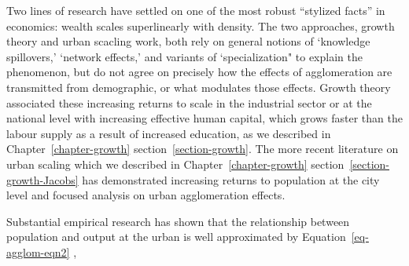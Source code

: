 Two lines of research have settled on one of the most robust ``stylized facts'' in economics: wealth scales superlinearly with density. The two approaches, growth theory and urban scacling work, both rely on general notions of `knowledge spillovers,' `network effects,' and variants of `specialization" to explain the phenomenon, but do not agree on precisely how the effects of agglomeration are transmitted from demographic, or what modulates those effects. 
 Growth theory associated these increasing returns to scale in the industrial sector or at the national level with increasing effective human capital, which grows faster than the labour supply as a result of increased education, as we described in Chapter~\ref{chapter-growth} section~\ref{section-growth}. %
 The more recent literature on urban scaling which we described in Chapter~\ref{chapter-growth} section~\ref{section-growth-Jacobs} has demonstrated increasing returns to population at the city level and focused analysis on urban agglomeration effects. 

  Substantial empirical research has shown that the relationship between population and output at the urban is well approximated by Equation~\ref{eq-agglom-eqn2} \cite{loboUrbanScalingProduction2013},    %

